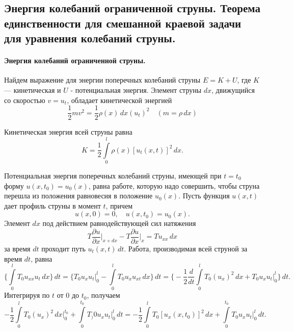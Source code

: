 \subsection{Энергия колебаний ограниченной струны. Теорема единственности для смешанной краевой задачи для уравнения колебаний струны.}

\paragraph{Энергия колебаний ограниченной струны.}

Найдем выражение для энергии поперечных колебаний струны $E = K + U$, где $K$ --- кинетическая и $U$ - потенциальная энергия. Элемент струны $dx$, движущийся со скоростью $v = u_t$, обладает кинетической энергией 
\begin{equation*}
	\frac{1}{2} m v^2 = \frac{1}{2} \rho(x) \, dx(u_t)^2 \quad (m = \rho \, dx)
\end{equation*}

Кинетическая энергия всей струны равна 
\begin{equation}
	K = \frac{1}{2} \int \limits_{0}^{l} \rho(x) [u_t(x, t)]^2 \, dx.
\end{equation}

Потенциальная энергия поперечных колебаний струны, имеющей при $t = t_0$ форму $u(x, t_0) = u_0(x)$, равна работе, которую надо совершить, чтобы струна перешла из положения равновесия в положение $u_0(x)$. Пусть функция $u(x, t)$ дает профиль струны в момент $t$, причем
\begin{equation*}
	u(x, 0) = 0, \quad u(x, t_0) = u_0(x).
\end{equation*}
Элемент $dx$ под действием равнодействующей сил натяжения 
\begin{equation*}
	T \frac{\partial u}{\partial x} \Big|_{x + dx} - T \frac{\partial u}{\partial x} \Big|_{x} = T u_{xx} \, dx
\end{equation*}
за время $dt$ проходит путь $u_t(x, t) \, dt$. Работа, производимая всей струной за время $dt$, равна
\begin{equation*}
	\Bigg\{\int \limits_{0}^{l} T_0 u_{xx} u_t \, dx \Bigg\} \, dt = \Bigg\{T_0 u_x u_t \Big|_{0}^{l} - \int \limits_{0}^{l} T_0 u_x u_{xt} \, dx \Bigg\} \, dt =  \Bigg\{-\frac{1}{2} \frac{d}{dt} \int \limits_{0}^{l} T_0 (u_x)^2 \, dx + T_0 u_x u_t \Big|_{0}^{l}\Bigg\} \, dt.
\end{equation*}
Интегрируя по $t$ от $0$ до $t_0$, получаем
\begin{equation*}
	-\frac{1}{2} \int \limits_{0}^{l} T_0(u_x)^2 \, dx \Big|_{0}^{t_0} + \int \limits_{0}^{t_0} T_)0 u_x u_t \Big|_{0}^{l} \, dt = -\frac{1}{2} \int \limits_{0}^{l} T_0 [u_x(x, t_0)]^2 \, dx + \int \limits_{0}^{t_0} T_0 u_x u_t \Big|_{0}^{l} \, dt.
\end{equation*}

